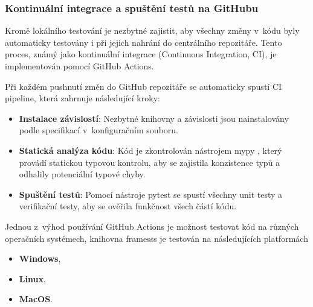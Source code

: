 \subsubsection*{Kontinuální integrace a spuštění testů na GitHubu}
Kromě lokálního testování je nezbytné zajistit, aby všechny změny v~kódu byly automaticky testovány i při jejich nahrání do centrálního repozitáře. Tento proces, známý jako kontinuální integrace (Continuous Integration, CI), je implementován pomocí GitHub Actions.

Při každém pushnutí změn do GitHub repozitáře se automaticky spustí CI pipeline, která zahrnuje následující kroky:
\begin{itemize}
    \item \textbf{Instalace závislostí}: Nezbytné knihovny a závislosti jsou nainstalovány podle specifikací v~konfiguračním souboru.
    \item \textbf{Statická analýza kódu}: Kód je zkontrolován nástrojem mypy \cite{mypy}, který provádí statickou typovou kontrolu, aby se zajistila konzistence typů a odhalily potenciální typové chyby.
    \item \textbf{Spuštění testů}: Pomocí nástroje pytest \cite{pytest} se spustí všechny unit testy a verifikační testy, aby se ověřila funkčnost všech částí kódu.
\end{itemize}

Jednou z~výhod používání GitHub Actions je možnost testovat kód na různých operačních systémech, knihovna framesss je testován na následujících platformách
\begin{itemize}
    \item \textbf{Windows},
    \item \textbf{Linux},
    \item \textbf{MacOS}.
\end{itemize}
